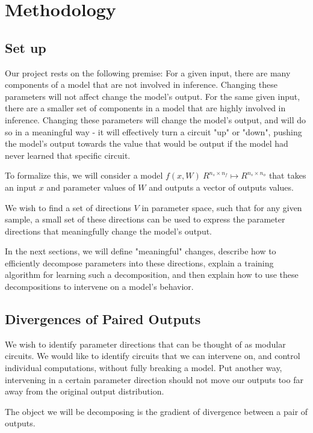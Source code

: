 \documentclass{article}
\theoremstyle{plain}
\theoremstyle{definition}
\theoremstyle{remark}
\begin{document}
\section{Methodology}


\subsection{Set up}

Our project rests on the following premise: For a given input, there are many components of a model that are not involved in inference. Changing these parameters will not affect change the model's output. For the same given input, there are a smaller set of components in a model that are highly involved in inference. Changing these parameters will change the model's output, and will do so in a meaningful way - it will effectively turn a circuit "up" or "down", pushing the model's output towards the value that would be output if the model had never learned that specific circuit. 

To formalize this, we will consider a model $f(x, W) ~ R^{n_s \times n_f} \mapsto R^{n_s \times n_o}$ that takes an input $x$ and parameter values of $W$ and outputs a vector of outputs values.

We wish to find a set of directions $V$ in parameter space, such that for any given sample, a small set of these directions can be used to express the parameter directions that meaningfully change the model's output. 

In the next sections, we will define "meaningful" changes, describe how to efficiently decompose parameters into these directions, explain a training algorithm for learning such a decomposition, and then explain how to use these decompositions to intervene on a model's behavior. 

\subsection{Divergences of Paired Outputs}
We wish to identify parameter directions that can be thought of as modular circuits. We would like to identify circuits that we can intervene on, and control individual computations, without fully breaking a model. Put another way, intervening in a certain parameter direction should not move our outputs too far away from the original output distribution.  

The object we will be decomposing is the gradient of divergence between a pair of outputs. 
\end{document}
